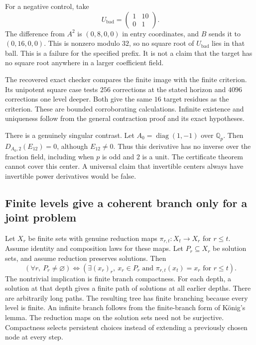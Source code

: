 For a negative control, take
\[
 U_{\mathrm{bad}}=\begin{pmatrix}1&10\\0&1\end{pmatrix}.
\]
The difference from $A^2$ is $(0,8,0,0)$ in entry coordinates, and $B$
sends it to $(0,16,0,0)$. This is nonzero modulo $32$, so no square root
of $U_{\mathrm{bad}}$ lies in that ball. This is a failure for the
specified prefix. It is not a claim that the target has no square root
anywhere in a larger coefficient field.

The recovered exact checker compares the finite image with the finite
criterion. Its unipotent square case tests $256$ corrections at the
stated horizon and $4096$ corrections one level deeper. Both give the same
$16$ target residues as the criterion. These are bounded corroborating
calculations. Infinite existence and uniqueness follow from the general
contraction proof and its exact hypotheses.

There is a genuinely singular contrast. Let
$A_0=\operatorname{diag}(1,-1)$ over $\mathbb Q_p$. Then
$D_{A_0,2}(E_{12})=0$, although $E_{12}\ne0$. Thus this derivative has
no inverse over the fraction field, including when $p$ is odd and $2$ is
a unit. The certificate theorem cannot cover this center. A universal
claim that invertible centers always have invertible power derivatives
would be false.

\subsection{Finite levels give a coherent branch only for a joint problem}

Let $X_r$ be finite sets with genuine reduction maps
$\pi_{r,t}:X_t\to X_r$ for $r\le t$. Assume identity and composition
laws for these maps. Let $P_r\subseteq X_r$ be solution sets, and assume
reduction preserves solutions. Then
\begin{equation}
 \left(\forall r,\ P_r\ne\varnothing\right)
 \Longleftrightarrow
 \left(\exists (x_r)_r,\ x_r\in P_r\text{ and }
 \pi_{r,t}(x_t)=x_r\text{ for }r\le t\right).
 \label{eq:appendix-branch-criterion}
\end{equation}
The nontrivial implication is finite branch compactness. For each depth,
a solution at that depth gives a finite path of solutions at all earlier
depths. There are arbitrarily long paths. The resulting tree has finite
branching because every level is finite. An infinite branch follows from
the finite-branch form of K\"onig's lemma. The reduction maps on the
solution sets need not be surjective. Compactness selects persistent
choices instead of extending a previously chosen node at every step.

